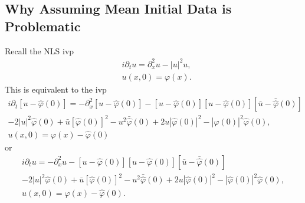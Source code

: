 \documentclass[12pt,reqno]{amsart}
\numberwithin{equation}{section}  %
\numberwithin{figure}{section}
\newcommand{\wh}{\widehat}
\newcommand{\p}{\partial}
\newcommand{\vp}{\varphi}
\theoremstyle{plain}
\theoremstyle{definition}
\theoremstyle{remark}
\begin{document}
\subsection{Why Assuming Mean Initial Data is Problematic}
Recall the NLS ivp
%
%
\begin{equation*}
	\begin{split}
		&i \p_t u = \p_x^2 u - | u |^2 u,
		\\
		& u(x,0) = \vp(x).
	\end{split}
\end{equation*}
%
%
This is equivalent to the ivp
%
%
\begin{gather*}
		 i \p_t [u - \wh{\vp}(0)]
		  = -\p_x^2 [u - \wh{\vp}(0)] - [u -
		\wh{\vp}(0)][u - \wh{\vp}(0)][\bar{u} - \bar{\wh{\vp}}(0)]
		\\
		- 2| u |^2
		\wh{\vp}(0) + \bar{u}\left[ \wh{\vp}(0) \right]^2 - u^{2}
		\bar{\wh{\vp}}(0) + 2 u | \wh{\vp}(0) |^2 - | \wh{\vp}(0) |^2
		\wh{\vp}(0),
		\\
		u(x,0) = \vp(x) - \wh{\vp}(0)
\end{gather*}
or
%
%
\begin{gather*}
		 i \p_t u 
		  = -\p_x^2 u - [u -
		\wh{\vp}(0)][u - \wh{\vp}(0)][\bar{u} - \bar{\wh{\vp}}(0)]
		\\
		- 2| u |^2
		\wh{\vp}(0) + \bar{u}\left[ \wh{\vp}(0) \right]^2 - u^{2}
		\bar{\wh{\vp}}(0) + 2 u | \wh{\vp}(0) |^2 - \boxed{| \wh{\vp}(0) |^2
		\wh{\vp}(0)},
		\\
		u(x,0) = \vp(x) - \wh{\vp}(0).
\end{gather*}
%
%
\end{document}
